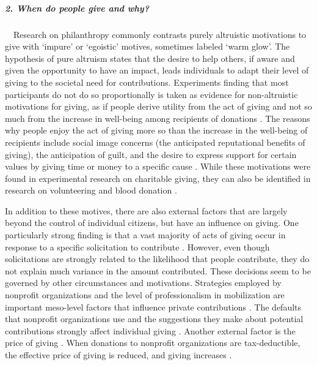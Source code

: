 \documentclass[twocolumn, serif, rga, numeric]{jote-article}
\begin{document}
\subparagraph{2. When do people give and why?}

\ \ Research on philanthropy commonly contrasts purely altruistic motivations to give with `impure' or `egoistic' motives, sometimes labeled `warm glow'\cite{Andreoni1990}. The hypothesis of pure altruism states that the desire to help others, if aware and given the opportunity to have an impact, leads individuals to adapt their level of giving to the societal need for contributions. Experiments finding that most participants do not do so proportionally is taken as evidence for non-altruistic motivations for giving, as if people derive utility from the act of giving and not so much from the increase in well-being among recipients of donations \cite{Ribar2002, deWit2016, Vesterlund2006}. The reasons why people enjoy the act of giving more so than the increase in the well-being of recipients include social image concerns (the anticipated reputational benefits of giving), the anticipation of guilt, and the desire to express support for certain values by giving time or money to a specific cause \cite{Bekkers2011b, Vesterlund2006}. While these motivations were found in experimental research on charitable giving, they can also be identified in research on volunteering \cite{Bekkers2014a} and blood donation \cite{Ferguson2015}.

In addition to these motives, there are also external factors that are largely beyond the control of individual citizens, but have an influence on giving. One particularly strong finding is that a vast majority of acts of giving occur in response to a specific solicitation to contribute \cite{Bekkers2005, Musick2008}. However, even though solicitations are strongly related to the likelihood that people contribute, they do not explain much variance in the amount contributed.
These decisions seem to be governed by other circumstances and motivations. Strategies employed by nonprofit organizations and the level of professionalism in mobilization are important meso-level factors that influence private contributions \cite{Breeze2015, Schreiber2006, Healy2000, Healy2004}. The defaults that nonprofit organizations use and the suggestions they make about potential contributions strongly affect individual giving \cite{vanDalen2014, Stutzer2011, Shepherd2014, McKenzie2006, Li2013, Johnson2003, Altmann2009, Altmann2019, Abadie2006} . Another external factor is the price of giving \cite{Bakija2011}. When donations to nonprofit organizations are tax-deductible, the effective price of giving is reduced, and giving increases \cite{Peloza2005}.
\end{document}
